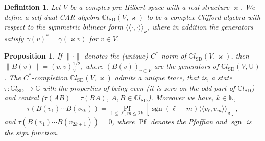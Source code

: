 \documentclass{article}
\newcommand{\cdummy}{\cdot}
\newcommand{\llangle}{{\langle\!\langle}}
\newcommand{\rrangle}{{\rangle\!\rangle}}
\newcommand{\tmop}[1]{\ensuremath{\operatorname{#1}}}
\newtheorem{definition}[theorem]{Definition}
\newtheorem{proposition}[theorem]{Proposition}
{\theorembodyfont{\rmfamily}\newtheorem{remark}[theorem]{Remark}}
\begin{document}
\begin{definition}
  \label{GPdef:self-dual}Let $V$ be a complex pre-Hilbert space with a real
  structure $\varkappa$. We define a self-dual CAR algebra
  $\mathbb{C}l_{\tmop{SD}} (V, \varkappa)$ to be a complex Clifford algebra
  with respect to the symmetric bilinear form $\llangle \cdummy, \cdummy
  \rrangle_{\varkappa}$, where in addition the generators satisfy $\gamma
  (v)^{\ast} = \gamma (\varkappa v)$ for $v \in V$.
\end{definition}

\begin{proposition}
  \label{GPpro:trace}If $\| \cdummy \|$ denotes the (unique) $C^{\ast}$-norm
  of $\mathbb{C}l_{\tmop{SD}} (V, \varkappa)$, then $\| B (v) \| = (v, v)_V^{1
  / 2} $, where $(B (v))_{v \in V}$ are the generators of
  $\mathbb{C}l_{\tmop{SD}} (V, \mathrm{U})$. The $C^{\ast}$-completion
  $\overline{\mathbb{C}l}_{\tmop{SD}} (V, \varkappa)$ admits a unique trace,
  that is, a state $\tau : \overline{\mathbb{C}l}_{\tmop{SD}} \rightarrow
  \mathbb{C}$ with the properties of being even (it is zero on the odd part of
  $\mathbb{C}l_{\tmop{SD}}$) and central ($\tau (A B) = \tau (B A)$, $A, B \in
  \mathbb{C}l_{\tmop{SD}}$). Moreover we have, $k \in \mathbb{N}$,
  \begin{equation}
    \tau (B (v_1) \cdots B (v_{2 k})) = \underset{1 \leqslant \ell, m
    \leqslant 2 k}{\tmop{Pf}} [\tmop{sgn} (\ell - m) \llangle v_{\ell}, v_m
    \rrangle_{\varkappa}], \label{eq:trace-GP}
  \end{equation}
  and $\tau (B (v_1) \cdots B (v_{2 k + 1})) = 0$, where $\tmop{Pf}$ denotes
  the Pfaffian and $\tmop{sgn}$ is the sign function.
\end{proposition}
\end{document}
